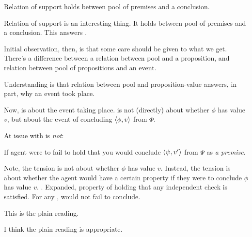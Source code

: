 \begin{note}
  \begin{observation}
    Relation of support holds between pool of premises and a conclusion.
  \end{observation}
\end{note}

\begin{note}
  Relation of support is an interesting thing.
  It holds between pool of premises and a conclusion.
  This answers \qWhy{}.

  Initial observation, then, is that some care should be given to what we get.
  There's a difference between a relation between pool and a proposition, and relation between pool of propositions and an event.

  Understanding is that relation between pool and proposition-value answers, in part, why an event took place.
\end{note}

\begin{note}
  Now, \qzS{} is about the event taking place.
  \qzS{} is not (directly) about whether \(\phi\) has value \(v\), but about the event of concluding \(\langle \phi, v \rangle\) from \(\Phi\).
\end{note}

\begin{note}
  At issue with \qzS{} is \emph{not}:

  If agent were to fail to hold that you would conclude \(\langle \psi, v' \rangle\) from \(\Psi\) as \emph{a premise}.
\end{note}

\begin{note}
  Note, the tension is not about whether \(\phi\) has value \(v\).
  Instead, the tension is about whether the agent would have a certain property if they were to conclude \(\phi\) has value \(v\).
  \zS{}.
  Expanded, property of holding that any independent check is satisfied.
  For any \requ{}, would not fail to conclude.
\end{note}

\begin{note}
  This is the plain reading.

  I think the plain reading is appropriate.
\end{note}

